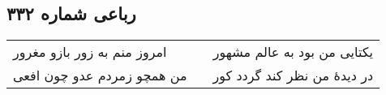 \begin{center}
\section*{رباعی شماره ۳۳۲}
\label{sec:sh332}
\begin{longtable}{l p{0.5cm} r}
امروز منم به زور بازو مغرور
&&
یکتایی من بود به عالم مشهور
\\
من همچو زمردم عدو چون افعی
&&
در دیدهٔ من نظر کند گردد کور
\\
\end{longtable}
\end{center}
